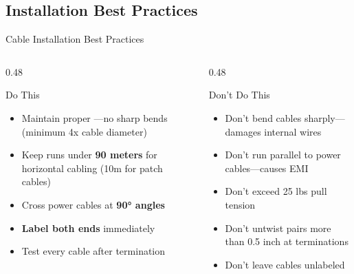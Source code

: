 \documentclass[aspectratio=169]{beamer}  %
\begin{document}
\subsection{Installation Best Practices}


\begin{frame}{Cable Installation Best Practices}
    \begin{columns}[T]
        \begin{column}{0.48\textwidth}
            \begin{block}{Do This}
                \begin{itemize}
                    \item Maintain proper ---no sharp bends (minimum 4x cable diameter)
                    \item Keep runs under \textbf{90 meters} for horizontal cabling (10m for patch cables)
                    \item Cross power cables at \textbf{90° angles}
                    \item \textbf{Label both ends} immediately
                    \item Test every cable after termination
                \end{itemize}
            \end{block}
        \end{column}
        \begin{column}{0.48\textwidth}
            \begin{alertblock}{Don't Do This}
                \begin{itemize}
                    \item Don't bend cables sharply---damages internal wires
                    \item Don't run parallel to power cables---causes EMI
                    \item Don't exceed 25 lbs pull tension
                    \item Don't untwist pairs more than 0.5 inch at terminations
                    \item Don't leave cables unlabeled
                \end{itemize}
            \end{alertblock}
        \end{column}
    \end{columns}
    

\end{frame}
\end{document}
